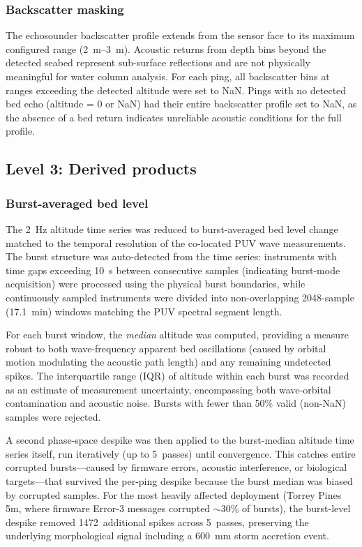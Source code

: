 \subsubsection{Backscatter masking}

The echosounder backscatter profile extends from the sensor face to
its maximum configured range (\SIrange{2}{3}{\meter}). Acoustic
returns from depth bins beyond the detected seabed represent
sub-surface reflections and are not physically meaningful for water
column analysis. For each ping, all backscatter bins at ranges
exceeding the detected altitude were set to NaN. Pings with no
detected bed echo (altitude = 0 or NaN) had their entire backscatter
profile set to NaN, as the absence of a bed return indicates
unreliable acoustic conditions for the full profile.

\subsection{Level 3: Derived products}

\subsubsection{Burst-averaged bed level}

The 2~Hz altitude time series was reduced to burst-averaged bed level
change matched to the temporal resolution of the co-located PUV wave
measurements. The burst structure was auto-detected from the time
series: instruments with time gaps exceeding \SI{10}{\second} between
consecutive samples (indicating burst-mode acquisition) were processed
using the physical burst boundaries, while continuously sampled
instruments were divided into non-overlapping 2048-sample
(\SI{17.1}{\minute}) windows matching the PUV spectral segment length.

For each burst window, the \emph{median} altitude was computed,
providing a measure robust to both wave-frequency apparent bed
oscillations (caused by orbital motion modulating the acoustic path
length) and any remaining undetected spikes. The interquartile range
(IQR) of altitude within each burst was recorded as an estimate of
measurement uncertainty, encompassing both wave-orbital contamination
and acoustic noise. Bursts with fewer than 50\% valid (non-NaN)
samples were rejected.

A second phase-space despike was then applied to the burst-median
altitude time series itself, run iteratively (up to 5~passes) until
convergence. This catches entire corrupted bursts---caused by firmware
errors, acoustic interference, or biological targets---that survived
the per-ping despike because the burst median was biased by corrupted
samples. For the most heavily affected deployment (Torrey Pines 5m,
where firmware Error-3 messages corrupted $\sim$30\% of bursts),
the burst-level despike removed 1472~additional spikes across 5~passes,
preserving the underlying morphological signal including a
\SI{600}{\milli\meter} storm accretion event.

